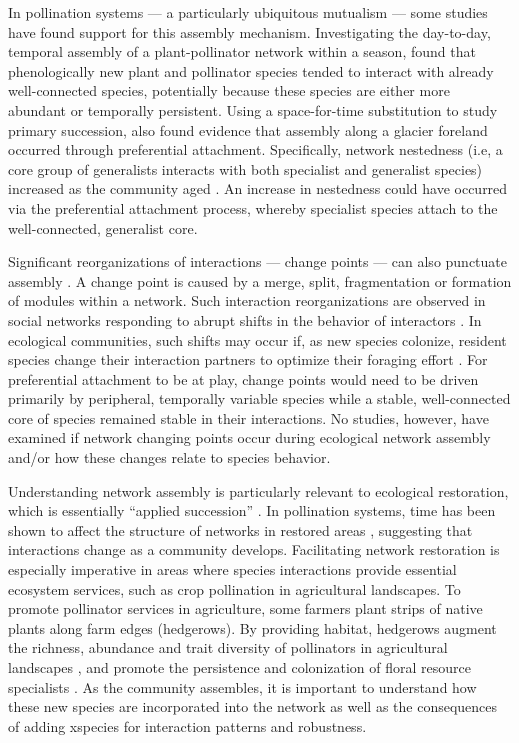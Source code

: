 \documentclass[12pt]{article}
\begin{document}
In
pollination systems --- a particularly ubiquitous mutualism
\citep{ollerton-2011-321, klein-2007-303} --- some studies have found
support for this assembly mechanism. Investigating the day-to-day,
temporal assembly of a plant-pollinator network within a season,
\cite{Olesen2008} found that phenologically new plant and pollinator
species tended to interact with already well-connected species,
potentially because these species are either more abundant or
temporally persistent. Using a space-for-time substitution to study
primary succession, \cite{albrecht2010plant} also found evidence that
assembly along a glacier foreland occurred through preferential
attachment. Specifically, network nestedness (i.e, a core group of
generalists interacts with both specialist and generalist species)
increased as the community aged \citep{albrecht2010plant}. An increase
in nestedness could have occurred via the preferential attachment
process, whereby specialist species attach to the well-connected,
generalist core.

Significant reorganizations of interactions --- change points --- can
also punctuate assembly \citep{peel2014detecting}. A change point is
caused by a merge, split, fragmentation or formation of modules within
a network. Such interaction reorganizations are observed in social
networks responding to abrupt shifts in the behavior of interactors
\citep{peel2014detecting}. In ecological communities, such shifts may
occur if, as new species colonize, resident species change their
interaction partners to optimize their foraging effort
\citep{pyke1984optimal, Bluthgen2007, valdovinos2010consequences,
  albrecht2010plant, valdovinos2013adaptive}. For preferential
attachment to be at play, change points would need to be driven
primarily by peripheral, temporally variable species while a stable,
well-connected core of species remained stable in their
interactions. No studies, however, have examined if network changing
points occur during ecological network assembly and/or how these
changes relate to species behavior.

Understanding network assembly is particularly relevant to ecological
restoration, which is essentially ``applied succession''
\citep[e.g.,][]{parker1997scale}.  In pollination systems, time has
been shown to affect the structure of networks in restored areas
\citep{forup-2008-742, devoto2012understanding}, suggesting that
interactions change as a community develops. Facilitating network
restoration is especially imperative in areas where species
interactions provide essential ecosystem services, such as crop
pollination in agricultural landscapes. To promote pollinator services
in agriculture, some farmers plant strips of native plants along farm
edges (hedgerows).  By providing habitat, hedgerows augment the
richness, abundance and trait diversity of pollinators in agricultural
landscapes \citep{morandin-2013-829, kremen-2015-602,
  ponisio2015farm}, and promote the persistence and colonization of
floral resource specialists \citep{mgonigle-2015-x}. As the community
assembles, it is important to understand how these new species are
incorporated into the network as well as the consequences of adding
xspecies for interaction patterns and robustness.
\end{document}
